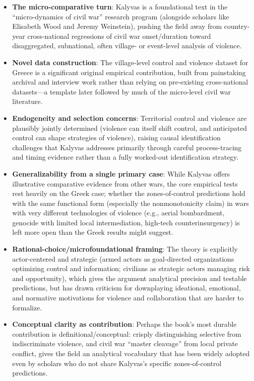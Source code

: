 \documentclass[12pt]{article}
\begin{document}
\begin{itemize}[leftmargin=*, itemsep=4pt]
    \item \textbf{The micro-comparative turn}: Kalyvas is a foundational text in the ``micro-dynamics of civil war'' research program (alongside scholars like Elisabeth Wood and Jeremy Weinstein), pushing the field away from country-year cross-national regressions of civil war onset/duration toward disaggregated, subnational, often village- or event-level analysis of violence.
    \item \textbf{Novel data construction}: The village-level control and violence dataset for Greece is a significant original empirical contribution, built from painstaking archival and interview work rather than relying on pre-existing cross-national datasets---a template later followed by much of the micro-level civil war literature.
    \item \textbf{Endogeneity and selection concerns}: Territorial control and violence are plausibly jointly determined (violence can itself shift control, and anticipated control can shape strategies of violence), raising causal identification challenges that Kalyvas addresses primarily through careful process-tracing and timing evidence rather than a fully worked-out identification strategy.
    \item \textbf{Generalizability from a single primary case}: While Kalyvas offers illustrative comparative evidence from other wars, the core empirical tests rest heavily on the Greek case; whether the zones-of-control predictions hold with the same functional form (especially the nonmonotonicity claim) in wars with very different technologies of violence (e.g., aerial bombardment, genocide with limited local intermediation, high-tech counterinsurgency) is left more open than the Greek results might suggest.
    \item \textbf{Rational-choice/microfoundational framing}: The theory is explicitly actor-centered and strategic (armed actors as goal-directed organizations optimizing control and information; civilians as strategic actors managing risk and opportunity), which gives the argument analytical precision and testable predictions, but has drawn criticism for downplaying ideational, emotional, and normative motivations for violence and collaboration that are harder to formalize.
    \item \textbf{Conceptual clarity as contribution}: Perhaps the book's most durable contribution is definitional/conceptual: crisply distinguishing selective from indiscriminate violence, and civil war ``master cleavage'' from local private conflict, gives the field an analytical vocabulary that has been widely adopted even by scholars who do not share Kalyvas's specific zones-of-control predictions.
\end{itemize}
\end{document}

